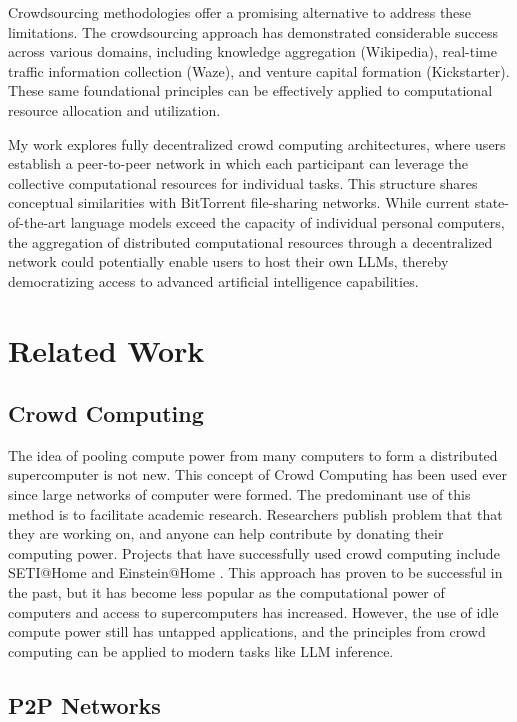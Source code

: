 \documentclass[preprint,twoside,11pt]{article}
\begin{document}
Crowdsourcing methodologies offer a promising alternative to address these limitations.
The crowdsourcing approach has demonstrated considerable success across various domains, including knowledge aggregation (Wikipedia),
real-time traffic information collection (Waze), and venture capital formation (Kickstarter).
These same foundational principles can be effectively applied to computational resource allocation and utilization.

My work explores fully decentralized crowd computing architectures,
where users establish a peer-to-peer network in which each participant can leverage the collective computational resources for individual tasks.
This structure shares conceptual similarities with BitTorrent file-sharing networks.
While current state-of-the-art language models exceed the capacity of individual personal computers,
the aggregation of distributed computational resources through a decentralized network could potentially enable users to host their own LLMs,
thereby democratizing access to advanced artificial intelligence capabilities.
\section{Related Work}

\subsection{Crowd Computing}

The idea of pooling compute power from many computers to form a distributed supercomputer is not new. This concept of Crowd Computing
has been used ever since large networks of computer were formed. The predominant use of this method is to facilitate academic research.
Researchers publish problem that that they are working on, and anyone can help contribute by donating their computing power.
Projects that have successfully used crowd computing include SETI@Home \citep{10.1145/581571.581573} and Einstein@Home \citep{Steltner_2021}.
This approach has proven to be successful in the past, but it has become less popular as the computational power of computers and access to supercomputers has increased.
However, the use of idle compute power still has untapped applications, and the principles from crowd computing can be applied to modern tasks like LLM inference.

\subsection{P2P Networks}
\end{document}

